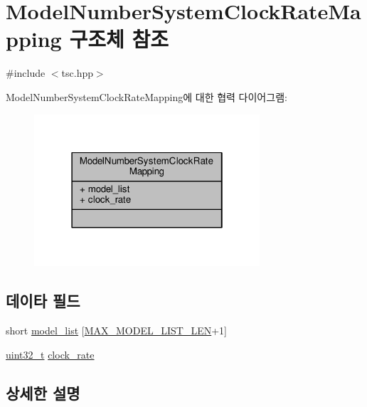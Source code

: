 \hypertarget{struct_model_number_system_clock_rate_mapping}{}\section{Model\+Number\+System\+Clock\+Rate\+Mapping 구조체 참조}
\label{struct_model_number_system_clock_rate_mapping}


{\ttfamily \#include $<$tsc.\+hpp$>$}



Model\+Number\+System\+Clock\+Rate\+Mapping에 대한 협력 다이어그램\+:
\nopagebreak
\begin{figure}[H]
\begin{center}
\leavevmode
\includegraphics[width=238pt]{struct_model_number_system_clock_rate_mapping__coll__graph}
\end{center}
\end{figure}
\subsection*{데이타 필드}
\begin{DoxyCompactItemize}
\item 
short \hyperlink{struct_model_number_system_clock_rate_mapping_a6b617b9adf3a5925c8ebeb9765c5685f}{model\+\_\+list} \mbox{[}\hyperlink{tsc_8hpp_ab1280b357d19363aa2fe21d3875f2f8b}{M\+A\+X\+\_\+\+M\+O\+D\+E\+L\+\_\+\+L\+I\+S\+T\+\_\+\+L\+EN}+1\mbox{]}
\item 
\hyperlink{parse_8c_a6eb1e68cc391dd753bc8ce896dbb8315}{uint32\+\_\+t} \hyperlink{struct_model_number_system_clock_rate_mapping_a4ff69d868409c6c16c86cab87ee0a3bf}{clock\+\_\+rate}
\end{DoxyCompactItemize}


\subsection{상세한 설명}


